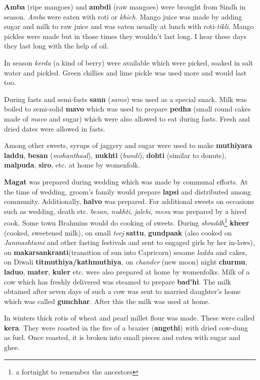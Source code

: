 \textbf{Amba} (ripe mangoes) and \textbf{ambdi} (raw mangoes) were brought from
Sindh in season. \textit{Amba} were eaten with roti or \textit{khich}. Mango
juice was made by adding sugar and milk to raw juice and was eaten usually at
lunch with roti-\textit{tikli}. Mango pickles were made but in those times they
wouldn't last long. I hear these days they last long with the help of oil.

In season \textit{kerda} (a kind of berry) were available which were picked,
soaked in salt water and pickled. Green chillies and lime pickle was used more
and would last too.

During fasts and semi-fasts \textbf{saun} (\textit{samo}) was used as a special
snack. Milk was boiled to semi-solid \textbf{mavo} which was used to prepare
\textbf{pedha} (small round cakes made of \textit{mavo} and sugar) which were
also allowed to eat during fasts. Fresh and dried dates were allowed in fasts.

Among other sweets, syrups of jaggery and sugar were used to make
\textbf{muthiyara laddu}, \textbf{besan} (\textit{mohanthaal}), \textbf{nukhti}
(\textit{bundi}), \textbf{dohti} (similar to donuts), \textbf{malpuda},
\textbf{siro}, etc. at home by womenfolk.

\textbf{Magat} was prepared during wedding which was made by communal efforts.
At the time of wedding, groom's family would prepare \textbf{lapsi} and
distributed among community. Additionally, \textbf{halvo} was prepared. For
additional sweets on occasions such as wedding, death etc. \textit{besan},
\textit{nukhti}, \textit{jalebi}, \textit{mesu} was prepared by a
hired cook. Some town Brahmins would do cooking of sweets. During
\textit{shraddh}\footnote{a fortnight to remember the ancestors}
\textbf{kheer} (cooked, sweetened milk), on small \textit{teej}
\textbf{sattu}, \textbf{gundpaak} (also cooked on
\textit{Janmashtami} and other fasting festivals and sent to
engaged girls by her in-laws), on
\textbf{makarsankranti}(transition of sun into Capricorn) sesame
\textit{laddu} and cakes, on Diwali \textbf{titmuthiya/kathmuthiya},
on \textit{chander} (new moon) night \textbf{churmu},
\textbf{laduo}, \textbf{mater}, \textbf{kuler} etc. were also
prepared at home by womenfolks. Milk of a cow which has freshly delivered was
steamed to prepare \textbf{bad'hi}. The milk obtained after seven days of such
a cow was sent to married daughter's home which was called \textbf{gunchhar}.
After this the milk was used at home. 

In winters thick rotis of wheat and pearl millet flour was made. These were
called \textbf{kera}. They were roasted in the fire of a brazier
(\textbf{angethi}) with dried cow-dung as fuel. Once roasted, it is broken into
small pieces and eaten with sugar and ghee.

